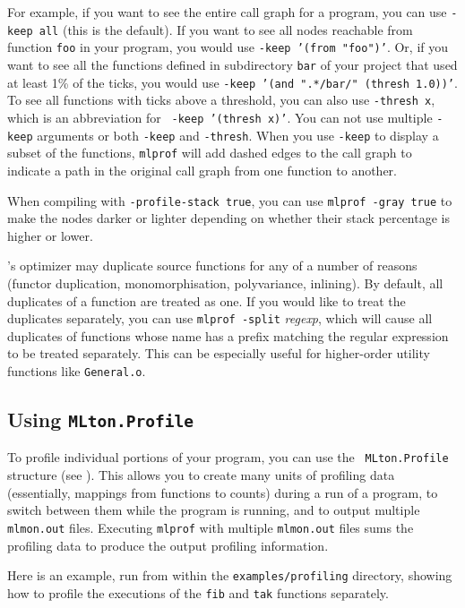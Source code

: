 For example, if you want to see the entire call graph for a program,
you can use {\tt -keep all} (this is the default).  If you want to see
all nodes reachable from function {\tt foo} in your program, you would
use {\tt -keep '(from "foo")'}.  Or, if you want to see all the
functions defined in subdirectory {\tt bar} of your project that used
at least 1\% of the ticks, you would use {\tt -keep '(and ".*/bar/"
(thresh 1.0))'}.  To see all functions with ticks above a threshold,
you can also use {\tt -thresh x}, which is an abbreviation for {\tt
-keep '(thresh x)'}.  You can not use multiple {\tt -keep} arguments
or both {\tt -keep} and {\tt -thresh}.  When you use {\tt -keep} to
display a subset of the functions, {\tt mlprof} will add dashed edges
to the call graph to indicate a path in the original call graph from
one function to another.

When compiling with {\tt -profile-stack true}, you can use {\tt mlprof
-gray true} to make the nodes darker or lighter depending on whether
their stack percentage is higher or lower.

{\mlton}'s optimizer may duplicate source functions for any of a
number of reasons (functor duplication, monomorphisation,
polyvariance, inlining).  By default, all duplicates of a function are
treated as one.  If you would like to treat the duplicates separately,
you can use {\tt mlprof -split} {\it regexp}, which will cause all
duplicates of functions whose name has a prefix matching the regular
expression to be treated separately.  This can be especially useful
for higher-order utility functions like {\tt General.o}.
%
\subsection{Using {\tt MLton.Profile}}

To profile individual portions of your program, you can use the {\tt
MLton.Profile} structure (see ).  This
allows you to create many units of profiling data (essentially,
mappings from functions to counts) during a run of a program, to
switch between them while the program is running, and to output
multiple {\tt mlmon.out} files.  Executing {\tt mlprof} with multiple
{\tt mlmon.out} files sums the profiling data to produce the output
profiling information.

Here is an example, run from within the {\tt examples/profiling}
directory, showing how to profile the executions of the {\tt fib} and
{\tt tak} functions separately.

